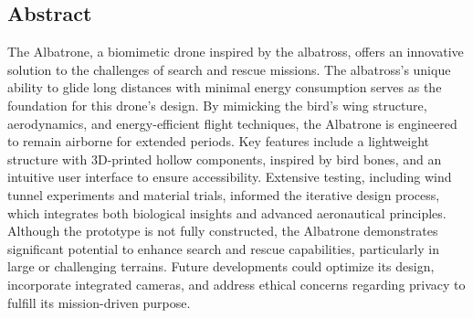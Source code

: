 \subsection{Abstract}
The Albatrone, a biomimetic drone inspired by the albatross, offers an innovative solution to the challenges of search and rescue missions. The albatross's unique ability to glide long distances with minimal energy consumption serves as the foundation for this drone's design. By mimicking the bird's wing structure, aerodynamics, and energy-efficient flight techniques, the Albatrone is engineered to remain airborne for extended periods. Key features include a lightweight structure with 3D-printed hollow components, inspired by bird bones, and an intuitive user interface to ensure accessibility. Extensive testing, including wind tunnel experiments and material trials, informed the iterative design process, which integrates both biological insights and advanced aeronautical principles. Although the prototype is not fully constructed, the Albatrone demonstrates significant potential to enhance search and rescue capabilities, particularly in large or challenging terrains. Future developments could optimize its design, incorporate integrated cameras, and address ethical concerns regarding privacy to fulfill its mission-driven purpose.